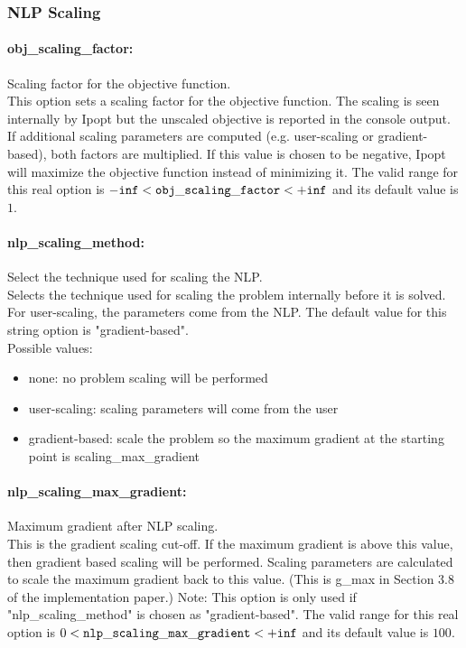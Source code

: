 \subsubsection{NLP Scaling}

\paragraph{obj\_scaling\_factor:} Scaling factor for the objective function. $\;$ \\
 This option sets a scaling factor for the
objective function. The scaling is seen
internally by Ipopt but the unscaled objective is
reported in the console output. If additional
scaling parameters are computed (e.g.
user-scaling or gradient-based), both factors are
multiplied. If this value is chosen to be
negative, Ipopt will maximize the objective
function instead of minimizing it. The valid range for this real option is 
${\tt -inf} <  {\tt obj\_scaling\_factor } <  {\tt +inf}$
and its default value is $1$.


\paragraph{nlp\_scaling\_method:} Select the technique used for scaling the NLP. $\;$ \\
 Selects the technique used for scaling the
problem internally before it is solved. For
user-scaling, the parameters come from the NLP.
The default value for this string option is "gradient-based".
\\ 
Possible values:
\begin{itemize}
   \item none: no problem scaling will be performed
   \item user-scaling: scaling parameters will come from the user
   \item gradient-based: scale the problem so the maximum gradient at
the starting point is scaling\_max\_gradient
\end{itemize}

\paragraph{nlp\_scaling\_max\_gradient:} Maximum gradient after NLP scaling. $\;$ \\
 This is the gradient scaling cut-off. If the
maximum gradient is above this value, then
gradient based scaling will be performed. Scaling
parameters are calculated to scale the maximum
gradient back to this value. (This is g\_max in
Section 3.8 of the implementation paper.) Note:
This option is only used if
"nlp\_scaling\_method" is chosen as
"gradient-based". The valid range for this real option is 
$0 <  {\tt nlp\_scaling\_max\_gradient } <  {\tt +inf}$
and its default value is $100$.

